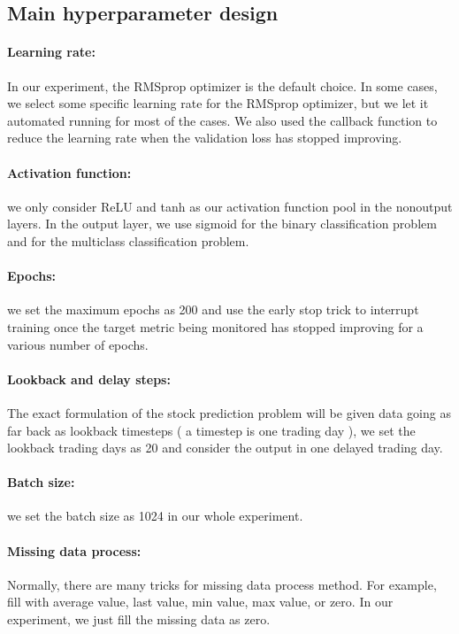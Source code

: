 \documentclass{article}
\begin{document}
\subsection{Main hyperparameter design}
\paragraph{Learning rate:} In our experiment, the RMSprop optimizer is the default choice. In some cases, we select some specific learning rate for the RMSprop optimizer, but we let it automated running for most of the cases. We also used the callback function to reduce the learning rate when the validation loss has stopped improving.

\paragraph{Activation function:} we only consider ReLU and tanh as our activation function pool in the nonoutput layers. In the output layer, we use sigmoid for the binary classification problem and  for the multiclass classification problem.

\paragraph{Epochs:} we set the maximum epochs as 200 and use the early stop trick to interrupt training once the target metric being monitored has stopped improving for a various number of epochs.
\paragraph{Lookback and delay steps:} The exact formulation of the stock prediction problem will be given data going as far back as lookback timesteps ( a timestep is one trading day ), we set the lookback trading days as 20 and consider the output in one delayed trading day.
\paragraph{Batch size:} we set the batch size as 1024 in our whole experiment.
\paragraph{Missing data process:} Normally, there are many tricks for missing data process method. For example, fill with average value, last value, min value, max value, or zero. In our experiment, we just fill the missing data as zero.
\end{document}
